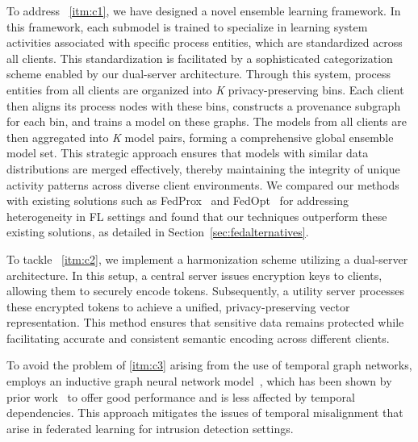 
To address ~\ref{itm:c1}, we have designed a novel ensemble learning framework. In this framework, each submodel is trained to specialize in learning system activities associated with specific process entities, which are standardized across all clients. This standardization is facilitated by a sophisticated categorization scheme enabled by our dual-server architecture. Through this system, process entities from all clients are organized into \textit{K} privacy-preserving bins. Each client then aligns its process nodes with these bins, constructs a provenance subgraph for each bin, and trains a \gnnshort model on these graphs. The models from all clients are then aggregated into \textit{K} model pairs, forming a comprehensive global ensemble model set. This strategic approach ensures that models with similar data distributions are merged effectively, thereby maintaining the integrity of unique activity patterns across diverse client environments. We compared our methods with existing solutions such as FedProx~\cite{li2020federated} and FedOpt~\cite{asad2020fedopt} for addressing heterogeneity in FL settings and found that our techniques outperform these existing solutions, as detailed in Section~\ref{sec:fedalternatives}.

To tackle ~\ref{itm:c2}, we implement a \wordvec harmonization scheme utilizing a dual-server architecture. In this setup, a central server issues encryption keys to clients, allowing them to securely encode \wordvec tokens. Subsequently, a utility server processes these encrypted tokens to achieve a unified, privacy-preserving vector representation. This method ensures that sensitive data remains protected while facilitating accurate and consistent semantic encoding across different clients.

To avoid the problem of \ref{itm:c3} arising from the use of temporal graph networks, \Sys employs an inductive graph neural network model~\cite{hamilton2017inductive}, which has been shown by prior work~\cite{flash2024,shadewatcher,wang2022threatrace} to offer good performance and is less affected by temporal dependencies. This approach mitigates the issues of temporal misalignment that arise in federated learning for intrusion detection settings.

